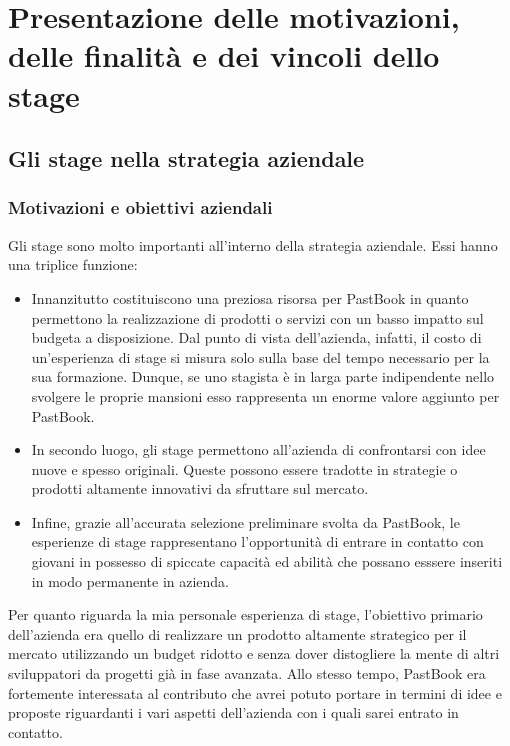 \chapter{Presentazione delle motivazioni, delle finalità e dei vincoli dello stage}
	\section{Gli stage nella strategia aziendale}
		\subsection{Motivazioni e obiettivi aziendali}
			Gli stage sono molto importanti all'interno della strategia aziendale. Essi hanno una triplice funzione:
			\begin{itemize}
				\item Innanzitutto costituiscono una preziosa risorsa per PastBook in quanto permettono la realizzazione di prodotti
				o servizi con un basso impatto sul budgeta a disposizione. Dal punto di vista dell'azienda, infatti, il costo di
				un'esperienza di stage si misura solo sulla base del tempo necessario per la sua formazione. Dunque, se uno stagista
				è in larga parte indipendente nello svolgere le proprie mansioni esso rappresenta un enorme valore aggiunto per
				PastBook.
				\item In secondo luogo, gli stage permettono all'azienda di confrontarsi con idee nuove e spesso originali. Queste
				possono essere tradotte in strategie o prodotti altamente innovativi da sfruttare sul mercato.
				\item Infine, grazie all'accurata selezione preliminare svolta da PastBook, le esperienze di stage rappresentano
				l'opportunità di entrare in contatto con giovani in possesso di spiccate capacità ed abilità che possano esssere
				inseriti in modo permanente in azienda.
			\end{itemize}
			Per quanto riguarda la mia personale esperienza di stage, l'obiettivo primario dell'azienda era quello di realizzare un
			prodotto altamente strategico per il mercato utilizzando un budget ridotto e senza dover distogliere la mente di altri
			sviluppatori da progetti già in fase avanzata. Allo stesso tempo, PastBook era fortemente interessata al contributo che avrei
			potuto portare in termini di idee e proposte riguardanti i vari aspetti dell'azienda con i quali sarei entrato in contatto.

